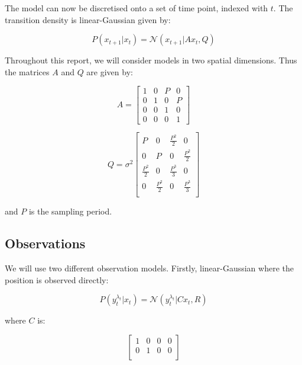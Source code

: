 The model can now be discretised onto a set of time point, indexed with $t$. The transition density is linear-Gaussian given by:

\begin{equation}
P(x_{t+1}|x_{t}) = \mathcal{N}(x_{t+1}|A x_{t},Q)
\label{eq:}
\end{equation}

Throughout this report, we will consider models in two spatial dimensions. Thus the matrices $A$ and $Q$ are given by:

\begin{equation}
A = \begin{bmatrix}
1 & 0 & P & 0 \\
0 & 1 & 0 & P \\
0 & 0 & 1 & 0 \\
0 & 0 & 0 & 1
\end{bmatrix}
\label{eq:}
\end{equation}

\begin{equation}
Q = \sigma^2 \begin{bmatrix}
P & 0 & \frac{P^2}{2} & 0 \\
0 & P & 0 & \frac{P^2}{2} \\
\frac{P^2}{2} & 0 & \frac{P^3}{3} & 0 \\
0 & \frac{P^2}{2} & 0 & \frac{P^3}{3} \\
\end{bmatrix}
\label{eq:}
\end{equation}

and $P$ is the sampling period.

\subsection{Observations}
We will use two different observation models. Firstly, linear-Gaussian where the position is observed directly:

\begin{equation}
P(y_t^{\lambda_t}|x_t) = \mathcal{N}(y_t^{\lambda_t}|C x_t, R)
\label{eq:}
\end{equation}

where $C$ is:

\begin{equation}
\begin{bmatrix}
1 & 0 & 0 & 0 \\
0 & 1 & 0 & 0 \\
\end{bmatrix}
\label{eq:}
\end{equation}

